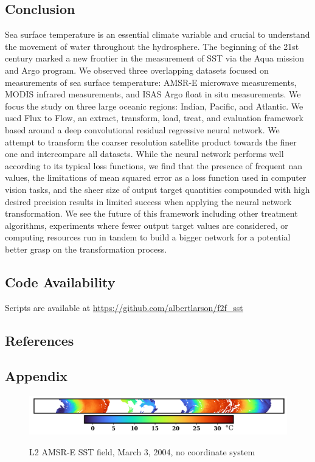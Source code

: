 \begin{refsection}
\subsection{Conclusion}
Sea surface temperature is an essential climate variable and crucial to understand the movement of water throughout the hydrosphere. The beginning of the 21st century marked a new frontier in the measurement of SST via the Aqua mission and Argo program. We observed three overlapping datasets focused on measurements of sea surface temperature: AMSR-E microwave measurements, MODIS infrared measurements, and ISAS Argo float in situ measurements. We focus the study on three large oceanic regions: Indian, Pacific, and Atlantic. We used Flux to Flow, an extract, transform, load, treat, and evaluation framework based around a deep convolutional residual regressive neural network. We attempt to transform the coarser resolution satellite product towards the finer one and intercompare all datasets. While the neural network performs well according to its typical loss functions, we find that the presence of frequent nan values, the limitations of mean squared error as a loss function used in computer vision tasks, and the sheer size of output target quantities compounded with high desired precision results in limited success when applying the neural network transformation. We see the future of this framework including other treatment algorithms, experiments where fewer output target values are considered, or computing resources run in tandem to build a bigger network for a potential better grasp on the transformation process. 

\newpage
\subsection{Code Availability}
Scripts are available at \url{https://github.com/albertlarson/f2f_sst}

\subsection{References}
\printbibliography[heading=none]
\end{refsection}

\newpage
\subsection{Appendix}
\begin{figure}[!ht]
	\centering
    \caption{L2 AMSR-E SST field, March 3, 2004, no coordinate system}
	\includegraphics[width=1.0\linewidth]{m2/ims/fig2_1.png}
    \label{fig2_1}
\end{figure}

